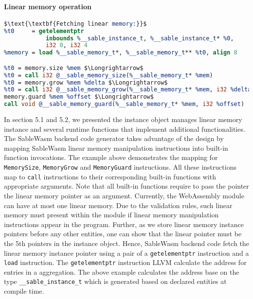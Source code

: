 \paragraph{Linear memory operation} \quad
\begin{lstlisting}[basicstyle=\linespread{0.9}\small\ttfamily, language=LLVM, mathescape=true]
$\text{\textbf{Fetching linear memory:}}$
%t0     = getelementptr 
            inbounds %__sable_instance_t, %__sable_instance_t* %0, 
            i32 0, i32 4
%memory = load %__sable_memory_t*, %__sable_memory_t** %t0, align 8

%t0 = memory.size %mem $\Longrightarrow$
%t0 = call i32 @__sable_memory_size(%__sable_memory_t* %mem)
%t0 = memory.grow %mem %delta $\Longrightarrow$
%t0 = call i32 @__sable_memory_grow(%__sable_memory_t* %mem, i32 %delta)
memory.guard %mem %offset $\Longrightarrow$
call void @__sable_memory_guard(%__sable_memory_t* %mem, i32 %offset)
\end{lstlisting}
In section 5.1 and 5.2, we presented the instance object manages linear memory instance and several runtime functions that implement additional functionalities. The SableWasm backend code generator takes advantage of the design by mapping SableWasm linear memory manipulation instructions into built-in function invocations. The example above demonstrates the mapping for \texttt{MemorySize}, \texttt{MemoryGrow} and \texttt{MemoryGuard} instructions. All these instructions map to \texttt{call} instructions to their corresponding built-in functions with appropriate arguments. Note that all built-in functions require to pass the pointer the linear memory pointer as an argument. Currently, the WebAssembly module can have at most one linear memory. Due to the validation rules, such linear memory must present within the module if linear memory manipulation instructions appear in the program. Further, as we store linear memory instance pointers before any other entities, one can show that the linear pointer must be the 5th pointers in the instance object. Hence, SableWasm backend code fetch the linear memory instance pointer using a pair of a \texttt{getelementptr} instruction and a \texttt{load} instruction. The \texttt{getelementptr} instruction LLVM calculate the address for entries in a aggregation. The above example calculates the address base on the type \texttt{\_\_sable\_instance\_t} which is generated based on declared entities at compile time.


